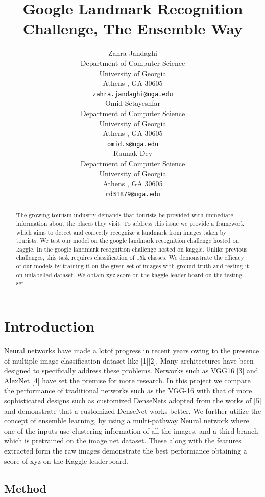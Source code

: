 \documentclass{article}
\title{Google Landmark Recognition Challenge, The Ensemble Way }
\author{
  Zahra Jandaghi \\
  Department of Computer Science\\
  University of Georgia\\
  Athens , GA 30605 \\
  \texttt{zahra.jandaghi@uga.edu} \\
  \And
  Omid Setayeshfar \\
  Department of Computer Science\\
  University of Georgia\\
  Athens , GA 30605 \\
  \texttt{omid.s@uga.edu} \\
  \And
  Raunak Dey \\
  Department of Computer Science\\
  University of Georgia\\
  Athens , GA 30605 \\
  \texttt{rd31879@uga.edu} \\
}
\begin{document}

\maketitle

\begin{abstract}
 The growing tourism industry demands that tourists be provided with immediate information about the places they visit.
 To address this issue we provide a framework which aims to detect and correctly recognize a landmark from images taken by tourists. 
 We test our model on the google landmark recognition challenge hosted on kaggle. 
 In the google landmark recognition challenge hosted on kaggle. 
 Unlike previous challenges, this task requires classification of 15k classes. We demonstrate the efficacy of our models by training it on the given set of images with ground truth and testing it on unlabelled dataset.
 We obtain xyz score on the kaggle leader board on the testing set.  
 
\end{abstract}

\section{Introduction}

Neural networks have made a lotof progress in recent years owing to the presence of multiple image classification dataset like [1][2].
Many architectures have been designed to specifically address these problems. Networks such as VGG16 [3] and AlexNet [4] have set the premise for more research.
In this project we compare the performance of traditional networks such as the VGG-16  with that of more sophisticated designs such as customized DenseNets adopted from the works of [5] and demonstrate that a customized DenseNet works better.
We further utilize the concept of ensemble learning, by using a multi-pathway Neural network where one of the inputs use clustering information of all the images, and a third branch which is pretrained on the image net dataset. These along with the features extracted form the raw images demonstrate the best performance obtaining a score of xyz on the Kaggle leaderboard.



\subsection{Method}
\end{document}
